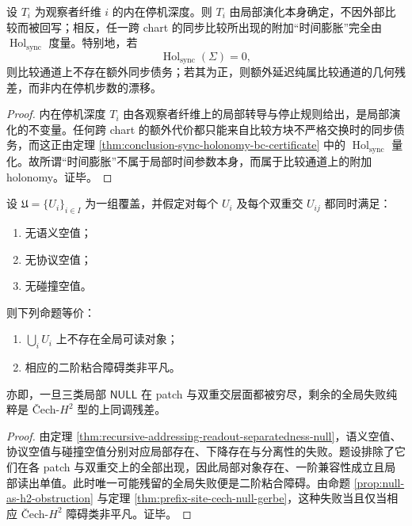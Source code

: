 \begin{corollary}[时间膨胀仅属于比较通道]\label{cor:conclusion-time-dilation-comparison-channel-only}
设 \(T_i\) 为观察者纤维 \(i\) 的内在停机深度。则 \(T_i\) 由局部演化本身确定，不因外部比较而被回写；相反，任一跨 chart 的同步比较所出现的附加“时间膨胀”完全由 \(\operatorname{Hol}_{\mathrm{sync}}\) 度量。特别地，若
\[
\operatorname{Hol}_{\mathrm{sync}}(\Sigma)=0,
\]
则比较通道上不存在额外同步债务；若其为正，则额外延迟纯属比较通道的几何残差，而非内在停机步数的漂移。
\end{corollary}
\begin{proof}
内在停机深度 \(T_i\) 由各观察者纤维上的局部转导与停止规则给出，是局部演化的不变量。任何跨 chart 的额外代价都只能来自比较方块不严格交换时的同步债务，而这正由定理 \ref{thm:conclusion-sync-holonomy-bc-certificate} 中的 \(\operatorname{Hol}_{\mathrm{sync}}\) 量化。故所谓“时间膨胀”不属于局部时间参数本身，而属于比较通道上的附加 holonomy。证毕。
\end{proof}

\begin{theorem}\label{thm:conclusion-global-null-pure-cohomological-remainder}
设 \(\mathfrak U=\{U_i\}_{i\in I}\) 为一组覆盖，并假定对每个 \(U_i\) 及每个双重交 \(U_{ij}\) 都同时满足：
\begin{enumerate}
  \item 无语义空值；
  \item 无协议空值；
  \item 无碰撞空值。
\end{enumerate}
则下列命题等价：
\begin{enumerate}
  \item \(\bigcup_i U_i\) 上不存在全局可读对象；
  \item 相应的二阶粘合障碍类非平凡。
\end{enumerate}
亦即，一旦三类局部 \(\mathsf{NULL}\) 在 patch 与双重交层面都被穷尽，剩余的全局失败纯粹是 Čech-\(H^2\) 型的上同调残差。
\end{theorem}
\begin{proof}
由定理 \ref{thm:recursive-addressing-readout-separatedness-null}，语义空值、协议空值与碰撞空值分别对应局部存在、下降存在与分离性的失败。题设排除了它们在各 patch 与双重交上的全部出现，因此局部对象存在、一阶兼容性成立且局部读出单值。此时唯一可能残留的全局失败便是二阶粘合障碍。由命题 \ref{prop:null-as-h2-obstruction} 与定理 \ref{thm:prefix-site-cech-null-gerbe}，这种失败当且仅当相应 Čech-\(H^2\) 障碍类非平凡。证毕。
\end{proof}

